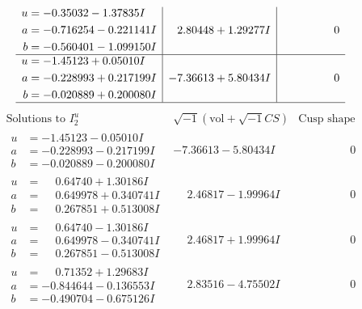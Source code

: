 \documentclass[1p]{elsarticle_modified}
\theoremstyle{definition}
\newcommand{\I}{\sqrt{-1}}
\begin{document}
$$\begin{array}{c|c|c}
\begin{aligned}
u &= -0.35032 - 1.37835 I \\
a &= -0.716254 - 0.221141 I \\
b &= -0.560401 - 1.099150 I\end{aligned}
 & \phantom{-}2.80448 + 1.29277 I & \phantom{-0.000000 } 0 \\ \hline\begin{aligned}
u &= -1.45123 + 0.05010 I \\
a &= -0.228993 + 0.217199 I \\
b &= -0.020889 + 0.200080 I\end{aligned}
 & -7.36613 + 5.80434 I & \phantom{-0.000000 } 0\\
 \hline 
 \end{array}$$\newpage$$\begin{array}{c|c|c}  
\text{Solutions to }I^u_{2}& \I (\text{vol} + \sqrt{-1}CS) & \text{Cusp shape}\\
 \hline 
\begin{aligned}
u &= -1.45123 - 0.05010 I \\
a &= -0.228993 - 0.217199 I \\
b &= -0.020889 - 0.200080 I\end{aligned}
 & -7.36613 - 5.80434 I & \phantom{-0.000000 } 0 \\ \hline\begin{aligned}
u &= \phantom{-}0.64740 + 1.30186 I \\
a &= \phantom{-}0.649978 + 0.340741 I \\
b &= \phantom{-}0.267851 + 0.513008 I\end{aligned}
 & \phantom{-}2.46817 - 1.99964 I & \phantom{-0.000000 } 0 \\ \hline\begin{aligned}
u &= \phantom{-}0.64740 - 1.30186 I \\
a &= \phantom{-}0.649978 - 0.340741 I \\
b &= \phantom{-}0.267851 - 0.513008 I\end{aligned}
 & \phantom{-}2.46817 + 1.99964 I & \phantom{-0.000000 } 0 \\ \hline\begin{aligned}
u &= \phantom{-}0.71352 + 1.29683 I \\
a &= -0.844644 - 0.136553 I \\
b &= -0.490704 - 0.675126 I\end{aligned}
 & \phantom{-}2.83516 - 4.75502 I & \phantom{-0.000000 } 0 \\ \hline\begin{aligned}

\end{aligned}
\end{array}$$
\end{document}
